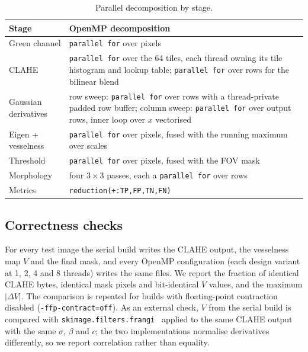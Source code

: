 \begin{table}[t]
\centering
\caption{Parallel decomposition by stage.}\label{tab:design}
\footnotesize
\begin{tabular}{@{}p{}p{}@{}}
\toprule
Stage & OpenMP decomposition \\
\midrule
Green channel & \texttt{parallel for} over pixels \\
CLAHE & \texttt{parallel for} over the 64 tiles, each thread owning its tile histogram and lookup table; \texttt{parallel for} over rows for the bilinear blend \\
Gaussian derivatives & row sweep: \texttt{parallel for} over rows with a thread-private padded row buffer; column sweep: \texttt{parallel for} over output rows, inner loop over $x$ vectorised \\
Eigen + vesselness & \texttt{parallel for} over pixels, fused with the running maximum over scales \\
Threshold & \texttt{parallel for} over pixels, fused with the FOV mask \\
Morphology & four $3\times3$ passes, each a \texttt{parallel for} over rows \\
Metrics & \texttt{reduction(+:TP,FP,TN,FN)} \\
\bottomrule
\end{tabular}
\end{table}

\subsection{Correctness checks}\label{sec:verify}
For every test image the serial build writes the CLAHE output, the vesselness map $V$ and the final mask, and
every OpenMP configuration (each design variant at 1, 2, 4 and 8 threads) writes the same files. We report the
fraction of identical CLAHE bytes, identical mask pixels and bit-identical $V$ values, and the maximum
$|\Delta V|$. The comparison is repeated for builds with floating-point contraction disabled
(\texttt{-ffp-contract=off}). As an external check, $V$ from the serial build is compared with
\texttt{skimage.\allowbreak filters.\allowbreak frangi}~\cite{vanderwalt2014} applied to the same CLAHE output with the same $\sigma$,
$\beta$ and $c$; the two implementations normalise derivatives differently, so we report correlation rather
than equality.

